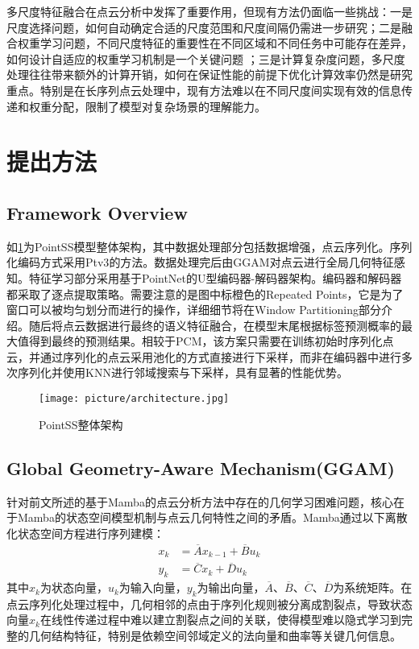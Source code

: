 \documentclass[preprint,12pt]{elsarticle}
\begin{document}
多尺度特征融合在点云分析中发挥了重要作用，但现有方法仍面临一些挑战\cite{multiscale_survey_2024}：一是尺度选择问题，如何自动确定合适的尺度范围和尺度间隔仍需进一步研究；二是融合权重学习问题，不同尺度特征的重要性在不同区域和不同任务中可能存在差异，如何设计自适应的权重学习机制是一个关键问题     
；三是计算复杂度问题，多尺度处理往往带来额外的计算开销，如何在保证性能的前提下优化计算效率仍然是研究重点。特别是在长序列点云处理中，现有方法难以在不同尺度间实现有效的信息传递和权重分配，限制了模型对复杂场景的理解能力。






\section{提出方法}

\subsection{ Framework Overview}
如\cref{fig:architecture}为PointSS模型整体架构，其中数据处理部分包括数据增强，点云序列化。序列化编码方式采用Ptv3\cite{ptv3}的方法。数据处理完后由GGAM对点云进行全局几何特征感知。特征学习部分采用基于PointNet的U型编码器-解码器架构。编码器和解码器都采取了逐点提取策略。需要注意的是图中标橙色的Repeated Points，它是为了窗口可以被均匀划分而进行的操作，详细细节将在Window Partitioning部分介绍。随后将点云数据进行最终的语义特征融合，在模型末尾根据标签预测概率的最大值得到最终的预测结果。相较于PCM，该方案只需要在训练初始时序列化点云，并通过序列化的点云采用池化的方式直接进行下采样，而非在编码器中进行多次序列化并使用KNN进行邻域搜索与下采样，具有显著的性能优势。
\begin{figure}[htbp]
	\centering
	\texttt{[image: picture/architecture.jpg]}
	\caption{PointSS整体架构}
	\label{fig:architecture}
\end{figure}


\subsection{Global Geometry-Aware Mechanism(GGAM)}


针对前文所述的基于Mamba的点云分析方法中存在的几何学习困难问题，核心在于Mamba的状态空间模型机制与点云几何特性之间的矛盾。Mamba通过以下离散化状态空间方程进行序列建模：
\begin{equation}
\begin{aligned}
x_{k} &= \overline{A}x_{k-1} + \overline{B}u_{k} \\
y_{k} &= \overline{C}x_{k} + \overline{D}u_{k}
\end{aligned}
\end{equation}
其中$x_k$为状态向量，$u_k$为输入向量，$y_k$为输出向量，$\overline{A}$、$\overline{B}$、$\overline{C}$、$\overline{D}$为系统矩阵。在点云序列化处理过程中，几何相邻的点由于序列化规则被分离成割裂点，导致状态向量$x_k$在线性传递过程中难以建立割裂点之间的关联，使得模型难以隐式学习到完整的几何结构特征，特别是依赖空间邻域定义的法向量和曲率等关键几何信息。
\end{document}

